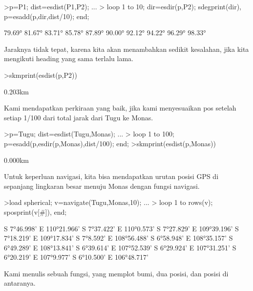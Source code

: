 \documentclass[a4paper,10pt]{article}
\begin{document}
\begin{eulernotebook}
\begin{eulercomment}
\begin{eulercomment}
\begin{eulercomment}
\begin{eulercomment}
\begin{eulercomment}
\begin{eulercomment}
\begin{eulercomment}
\begin{eulercomment}
\begin{eulercomment}
\begin{eulercomment}
\begin{eulercomment}
\begin{eulercomment}
\begin{eulercomment}
\begin{eulercomment}
\begin{eulercomment}
\begin{eulercomment}
\begin{eulerprompt}
>p=P1;  dist=esdist(P1,P2); ...
>  loop 1 to 10; dir=esdir(p,P2); sdegprint(dir), p=esadd(p,dir,dist/10); end;
\end{eulerprompt}
\begin{euleroutput}
       79.69°
       81.67°
       83.71°
       85.78°
       87.89°
       90.00°
       92.12°
       94.22°
       96.29°
       98.33°
\end{euleroutput}
\begin{eulercomment}
Jaraknya tidak tepat, karena kita akan menambahkan sedikit kesalahan,
jika kita mengikuti heading yang sama terlalu lama.
\end{eulercomment}
\begin{eulerprompt}
>skmprint(esdist(p,P2))
\end{eulerprompt}
\begin{euleroutput}
       0.203km
\end{euleroutput}
\begin{eulercomment}
Kami mendapatkan perkiraan yang baik, jika kami menyesuaikan pos
setelah setiap 1/100 dari total jarak dari Tugu ke Monas.
\end{eulercomment}
\begin{eulerprompt}
>p=Tugu; dist=esdist(Tugu,Monas); ...
>  loop 1 to 100; p=esadd(p,esdir(p,Monas),dist/100); end;
>skmprint(esdist(p,Monas))
\end{eulerprompt}
\begin{euleroutput}
       0.000km
\end{euleroutput}
\begin{eulercomment}
Untuk keperluan navigasi, kita bisa mendapatkan urutan posisi GPS di
sepanjang lingkaran besar menuju Monas dengan fungsi navigasi.
\end{eulercomment}
\begin{eulerprompt}
>load spherical; v=navigate(Tugu,Monas,10); ...
>  loop 1 to rows(v); sposprint(v[#]), end;
\end{eulerprompt}
\begin{euleroutput}
  S 7°46.998' E 110°21.966'
  S 7°37.422' E 110°0.573'
  S 7°27.829' E 109°39.196'
  S 7°18.219' E 109°17.834'
  S 7°8.592' E 108°56.488'
  S 6°58.948' E 108°35.157'
  S 6°49.289' E 108°13.841'
  S 6°39.614' E 107°52.539'
  S 6°29.924' E 107°31.251'
  S 6°20.219' E 107°9.977'
  S 6°10.500' E 106°48.717'
\end{euleroutput}
\begin{eulercomment}
Kami menulis sebuah fungsi, yang memplot bumi, dua posisi, dan posisi
di antaranya.
\end{eulercomment}

\end{eulercomment}
\end{eulercomment}
\end{eulercomment}
\end{eulercomment}
\end{eulercomment}
\end{eulercomment}
\end{eulercomment}
\end{eulercomment}
\end{eulercomment}
\end{eulercomment}
\end{eulercomment}
\end{eulercomment}
\end{eulercomment}
\end{eulercomment}
\end{eulercomment}
\end{eulercomment}
\end{eulernotebook}
\end{document}
